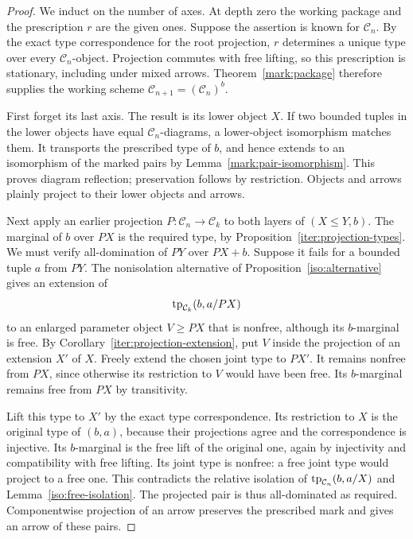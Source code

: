 \begin{proof}
We induct on the number of axes. At depth zero the working
package and the prescription $r$ are the given ones. Suppose
the assertion is known for $\mathcal C_n$. By the exact type
correspondence for the root projection, $r$ determines a unique
type over every $\mathcal C_n$-object. Projection commutes with
free lifting, so this prescription is stationary, including
under mixed arrows. Theorem~\ref{mark:package} therefore supplies
the working scheme
$\mathcal C_{n+1}=(\mathcal C_n)^b$.

First forget its last axis. The result is its lower object
$X$. If two bounded tuples in the lower objects have equal
$\mathcal C_n$-diagrams, a lower-object isomorphism matches them.
It transports the prescribed type of $b$, and hence extends
to an isomorphism of the marked pairs by
Lemma~\ref{mark:pair-isomorphism}. This proves diagram reflection;
preservation follows by restriction. Objects and arrows plainly
project to their lower objects and arrows.

Next apply an earlier projection
$P:\mathcal C_n\to\mathcal C_k$ to both layers of
$(X\le Y,b)$. The marginal of $b$ over $PX$ is the required
type, by Proposition~\ref{iter:projection-types}. We must verify
all-domination of $PY$ over $PX+b$. Suppose it fails for a
bounded tuple $a$ from $PY$. The nonisolation alternative of
Proposition~\ref{iso:alternative} gives
an extension of
\[
 \operatorname{tp}_{\mathcal C_k}(b,a/PX)
\]
to an enlarged parameter object $V\ge PX$ that is nonfree,
although its $b$-marginal is free. By
Corollary~\ref{iter:projection-extension}, put $V$ inside the
projection of an extension $X'$ of $X$. Freely extend the
chosen joint type to $PX'$. It remains nonfree from $PX$,
since otherwise its restriction to $V$ would have been free.
Its $b$-marginal remains free from $PX$ by transitivity.

Lift this type to $X'$ by the exact type correspondence. Its
restriction to $X$ is the original type of $(b,a)$, because
their projections agree and the correspondence is injective.
Its $b$-marginal is the free lift of the original one, again
by injectivity and compatibility with free lifting. Its joint
type is nonfree: a free joint type would project to a free
one. This contradicts the relative isolation of
$\operatorname{tp}_{\mathcal C_n}(b,a/X)$ and
Lemma~\ref{iso:free-isolation}. The projected pair is thus
all-dominated as required. Componentwise projection of an arrow
preserves the prescribed mark and gives an arrow of these pairs.


\end{proof}
